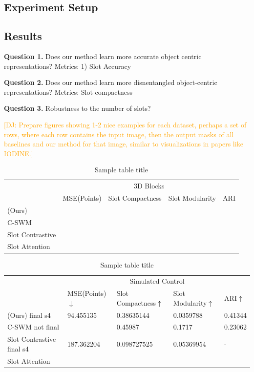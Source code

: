 \documentclass{article}
\newcommand{\jd}[1]{\textcolor{orange}{[DJ: #1]}}
\begin{document}

\subsection{Experiment Setup}

\subsection{Results}
\textbf{Question 1.} Does our method learn more accurate object centric representations?
Metrics: 1) Slot Accuracy 

\textbf{Question 2.} Does our method learn more disnentangled object-centric representations? Metrics: Slot compactness

\textbf{Question 3.} Robustness to the number of slots?

\jd{Prepare figures showing 1-2 nice examples for each dataset, perhaps a set of rows, where each row contains the input image, then the output masks of all baselines and our method for that image, similar to visualizations in papers like IODINE.}



\begin{table}
  \caption{Sample table title}
  \label{sample-table}
  \centering
  \begin{tabular}{lllll}
    \toprule
    \multicolumn{1}{c}{} & \multicolumn{4}{c}{3D Blocks} \\
    \cmidrule(r){2-5}  
      & MSE(Points)     & Slot Compactness     & Slot Modularity     & ARI  \\
    \midrule
    (Ours) &   &  &  &     \\
    C-SWM &    & &  &     \\
    Slot Contrastive &        & \\
    Slot Attention &    \\
    \bottomrule
  \end{tabular}
\end{table}
\begin{table}
  \caption{Sample table title}
  \label{sample-table}
  \centering
  \begin{tabular}{lllll}
    \toprule
    \multicolumn{1}{c}{} & \multicolumn{4}{c}{Simulated Control} \\
    \cmidrule(r){2-5}  
      & MSE(Points)$\downarrow$      & Slot Compactness$\uparrow$     & Slot Modularity$\uparrow$     & ARI$\uparrow$  \\
    \midrule
    (Ours) final s4 & 94.455135 &  0.38635144  & 0.0359788&0.41344     \\
    C-SWM not final &  &  0.45987  & 0.1717  &0.23062    \\
    Slot Contrastive final s4& 187.362204     & 0.098727525       & 0.05369954 & -\\
    Slot Attention &    \\
    \bottomrule
  \end{tabular}
\end{table}
\end{document}
